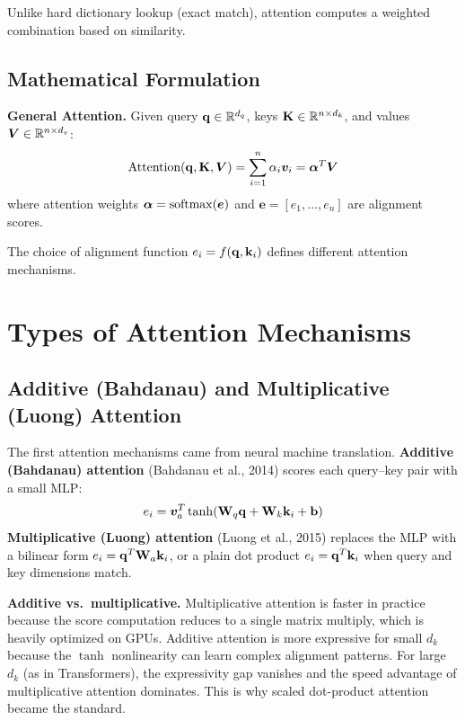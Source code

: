 Unlike hard dictionary lookup (exact match), attention computes a weighted combination based on similarity.

\subsection{Mathematical Formulation}

\textbf{General Attention.}
Given query $\mathbf{q} \in \mathbb{R}^{d_q}$, keys $\mathbf{K} \in \mathbb{R}^{n \times d_k}$, and values $\bm{V} \in \mathbb{R}^{n \times d_v}$:
\begin{equation}
\text{Attention}(\mathbf{q}, \mathbf{K}, \bm{V}) = \sum_{i=1}^{n} \alpha_i \bm{v}_i = \bm{\alpha}^T \bm{V}
\end{equation}
where attention weights $\bm{\alpha} = \operatorname{softmax}(\bm{e})$ and $\bm{e} = [e_1, \ldots, e_n]$ are alignment scores.

The choice of alignment function $e_i = f(\mathbf{q}, \mathbf{k}_i)$ defines different attention mechanisms.

\section{Types of Attention Mechanisms}
\label{sec:attention_types}

\subsection{Additive (Bahdanau) and Multiplicative (Luong) Attention}

The first attention mechanisms came from neural machine translation. \textbf{Additive (Bahdanau) attention} (Bahdanau et al., 2014) scores each query--key pair with a small MLP:
\begin{equation}
e_i = \bm{v}_a^T \tanh(\mathbf{W}_q \mathbf{q} + \mathbf{W}_k \mathbf{k}_i + \mathbf{b})
\end{equation}
\textbf{Multiplicative (Luong) attention} (Luong et al., 2015) replaces the MLP with a bilinear form $e_i = \mathbf{q}^T \mathbf{W}_a \mathbf{k}_i$, or a plain dot product $e_i = \mathbf{q}^T \mathbf{k}_i$ when query and key dimensions match.

\textbf{Additive vs.\ multiplicative.} Multiplicative attention is faster in practice because the score computation reduces to a single matrix multiply, which is heavily optimized on GPUs. Additive attention is more expressive for small $d_k$ because the $\tanh$ nonlinearity can learn complex alignment patterns. For large $d_k$ (as in Transformers), the expressivity gap vanishes and the speed advantage of multiplicative attention dominates. This is why scaled dot-product attention became the standard.

